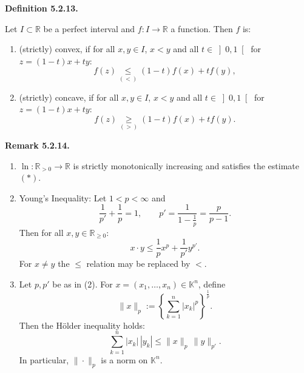 \documentclass[12pt]{article}
\newenvironment{definition}[1]{%
  \par\vspace{6pt}\noindent\textbf{Definition #1.}\itshape\space
}{%
  \par\vspace{6pt}
}
\newenvironment{bemerkung}[1]{%
  \par\vspace{6pt}\noindent\textbf{Remark #1.}\itshape\space
}{%
  \par\vspace{6pt}
}
\begin{document}
\begin{definition}{5.2.13}
Let $I \subset \mathbb{R}$ be a perfect interval and $f : I \to \mathbb{R}$ a function. Then $f$ is:
\begin{enumerate}
    \item (strictly) convex, if for all $x, y \in I$, $x < y$ and all $t \in \left]0,1\right[$ for $z = (1-t)x + ty$:
    \[
        f(z) \underset{(<)}{\leq} (1-t)f(x) + tf(y),
    \]
    \item (strictly) concave, if for all $x, y \in I$, $x < y$ and all $t \in \left]0,1\right[$ for $z = (1-t)x + ty$:
    \[
        f(z) \underset{(>)}{\geq} (1-t)f(x) + tf(y).
    \]
\end{enumerate}
\end{definition}

\begin{bemerkung}{5.2.14}
\hfill
\begin{enumerate}
    \item $\ln : \mathbb{R}_{>0} \to \mathbb{R}$ is strictly monotonically increasing and satisfies the estimate $(*)$.

    \item Young's Inequality: Let $1 < p < \infty$ and
    \[
        \frac{1}{p'} + \frac{1}{p} = 1, \qquad p' = \frac{1}{1 - \frac{1}{p}} = \frac{p}{p-1}.
    \]
    Then for all $x, y \in \mathbb{R}_{\geq 0}$:
    \[
        x \cdot y \leq \frac{1}{p}x^p + \frac{1}{p'}y^{p'}.
    \]
    For $x \neq y$ the $\leq$ relation may be replaced by $<$.

    \item Let $p, p'$ be as in (2). For $x = (x_1, \ldots, x_n) \in \mathbb{K}^n$, define
    \[
        \|x\|_p := \left\{\sum_{k=1}^{n} |x_k|^p\right\}^{\frac{1}{p}}.
    \]
    Then the H\"{o}lder inequality holds:
    \[
        \sum_{k=1}^{n} |x_k|\,|y_k| \leq \|x\|_p\,\|y\|_{p'}.
    \]
    In particular, $\|\cdot\|_p$ is a norm on $\mathbb{K}^n$.
\end{enumerate}
\end{bemerkung}
\end{document}
